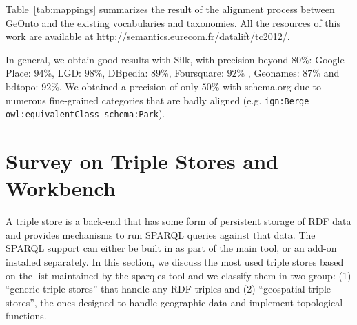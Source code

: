 Table~\ref{tab:mappings} summarizes the result of the alignment process between GeOnto and the existing vocabularies and taxonomies. All the resources of this work are available at \url{http://semantics.eurecom.fr/datalift/tc2012/}.
\begin{table}
\end{table}

In general, we obtain good results with Silk, with precision beyond $80$\%: Google Place: $94$\%, LGD: $98$\%, DBpedia: $89$\%, Foursquare: $92$\% , Geonames: $87$\% and bdtopo: $92$\%. We obtained a precision of only $50$\% with schema.org due to numerous fine-grained categories that are badly aligned (e.g. \texttt{ign:Berge owl:equivalentClass schema:Park}).

\section{Survey on Triple Stores and Workbench}
\label{sec:surveytps}
A triple store is a back-end that has some form of persistent storage of RDF data and provides mechanisms to run SPARQL \cite{sparql11} queries against that data. The SPARQL support can either be built in as part of the main tool, or an add-on installed separately. In this section, we discuss the most used triple stores based on the list maintained by the sparqles tool \cite{sparqles13} and we classify them in two group: (1) ``generic triple stores'' that handle any RDF triples and (2) ``geospatial triple stores'', the ones designed to handle geographic data and implement topological functions.

